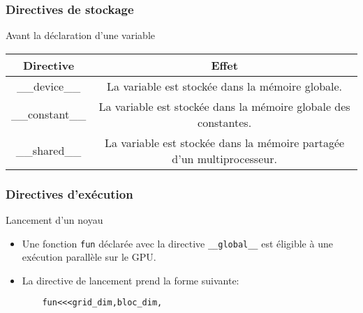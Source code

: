 \begin{frame}
    \frametitle{Directives de stockage}
\begin{block}{Avant la déclaration d'une variable}
    \renewcommand{\arraystretch}{2.5}
    \vskip 20pt
    \begin{tabular}{|c|c|}
        \hline
        \rowcolor{lightgray} Directive & Effet \\ \hline
        \_\_device\_\_ & \begin{minipage}{0.8\textwidth}
            La variable est stockée dans la mémoire globale. 
        \end{minipage} \\ \hline
        \_\_constant\_\_ & \begin{minipage}{0.8\textwidth}
            La variable est stockée dans la mémoire globale des constantes.
        \end{minipage} \\ \hline
        \_\_shared\_\_ & \begin{minipage}{0.8\textwidth}
            La variable est stockée dans la mémoire partagée d'un multiprocesseur.
        \end{minipage} \\ \hline
    \end{tabular}
\end{block}
\end{frame}

\begin{frame}
    \frametitle{Directives d'exécution}
\begin{block}{Lancement d'un noyau}
    \begin{itemize}
          \item<+-> Une fonction \texttt{fun} déclarée avec la directive \texttt{\_\_global\_\_} est éligible à une exécution parallèle 
  sur le GPU.
  \item<+-> La directive de lancement prend la forme suivante:
  \begin{verbatim}
    fun<<<grid_dim,bloc_dim,
  \end{verbatim}
    \end{itemize}

\end{block}

\end{frame}
